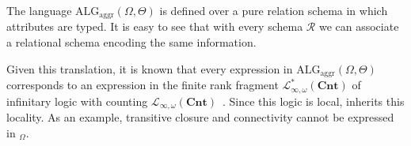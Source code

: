 The language $\text{ALG}_{\text{aggr}}(\Omega,\Theta)$ is defined over a pure relation schema in which attributes are typed. It is easy to see that with every \ARA schema $\mathcal{R}$ we can associate a relational schema encoding the same information.

Given this translation, it is known that every expression in  $\text{ALG}_{\text{aggr}}(\Omega,\Theta)$ corresponds to an expression in the finite rank fragment $\mathcal{L}_{\infty,\omega}^*(\textbf{Cnt})$ of infinitary logic with counting $\mathcal{L}_{\infty,\omega}(\textbf{Cnt})$~\cite{Hella:2001}. 
Since this logic is local, \ARA inherits this locality. As an example, 
transitive closure and connectivity cannot be expressed in \ARA$_{\Omega}$.
